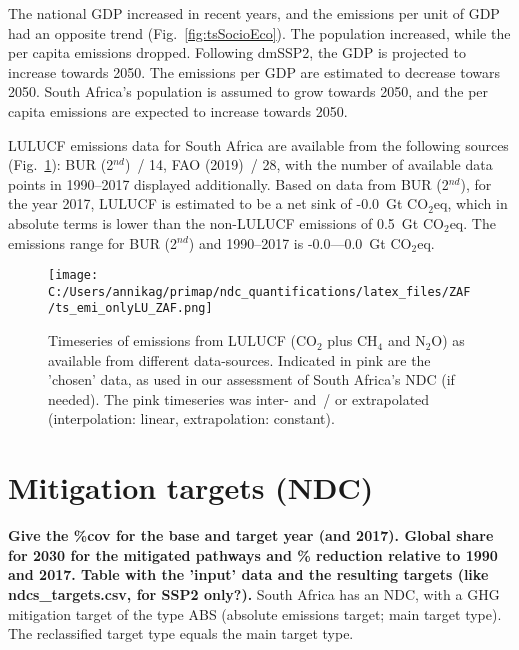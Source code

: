 \documentclass[12pt]{article}
\begin{document}
 The national GDP increased in recent years, and the emissions per unit of GDP had an opposite trend (Fig.~\ref{fig:tsSocioEco}).
 The population increased, while the per capita emissions dropped. 
 Following dmSSP2, the GDP is projected to increase towards 2050. 
 The emissions per GDP are estimated to decrease towars 2050. 
 South Africa's population is assumed to grow towards 2050, and the per capita emissions are expected to increase towards 2050. 

 LULUCF emissions data for South Africa are available from the following sources (Fig.~\ref{fig:tsLULUCF}): BUR (2$^{nd}$)~/ 14, FAO (2019)~/ 28, with the number of available data points in 1990--2017 displayed additionally.
 Based on data from BUR (2$^{nd}$), for the year 2017, LULUCF is estimated to be a net sink of -0.0~Gt CO$_2$eq, which in absolute terms is lower than the non-LULUCF emissions of 0.5~Gt CO$_2$eq.
 The emissions range for BUR (2$^{nd}$) and 1990--2017 is -0.0---0.0~Gt CO$_2$eq.

 \begin{figure}[H]
 \centering
 \texttt{[image: C:/Users/annikag/primap/ndc\_quantifications/latex\_files/ZAF/ts\_emi\_onlyLU\_ZAF.png]}
 \caption{Timeseries of emissions from LULUCF (CO$_2$ plus CH$_4$ and N$_2$O) as available from different data-sources. 
 Indicated in pink are the 'chosen' data, as used in our assessment of South Africa's NDC (if needed). 
 The pink timeseries was inter- and~/ or extrapolated (interpolation: linear, extrapolation: constant).}
 \label{fig:tsLULUCF}
 \end{figure}

 \newpage %
 \section{Mitigation targets (NDC)}
 \label{sec:mitiTars}

 \textbf{ 
 Give the \%cov for the base and target year (and 2017). \newline
 Global share for 2030 for the mitigated pathways and \% reduction relative to 1990 and 2017. \newline
 Table with the 'input' data and the resulting targets (like ndcs\_targets.csv, for SSP2 only?). \newline}
 South Africa has an NDC, with a GHG mitigation target of the type ABS (absolute emissions target; main target type).
 The reclassified target type equals the main target type.
\end{document}
